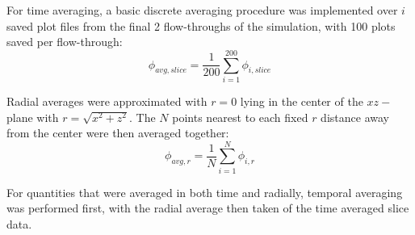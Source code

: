 For time averaging, a basic discrete averaging procedure was implemented over $i$ saved plot files from the final 2 flow-throughs of the simulation, with 100 plots saved per flow-through:
\begin{equation} \label{discrete_time_avg}
\phi_{avg, slice} = \dfrac{1}{200} \sum\limits_{i=1}^{200} \phi_{i, slice}
\end{equation}

Radial averages were approximated with $r = 0$ lying in the center of the $xz-$plane with $r = \sqrt{x^2 + z^2}$. The $N$ points nearest to each fixed $r$ distance away from the center were then averaged together:
\begin{equation} \label{discrete_time_avg}
\phi_{avg, r} = \dfrac{1}{N} \sum\limits_{i=1}^{N} \phi_{i, r}
\end{equation}

For quantities that were averaged in both time and radially, temporal averaging was performed first, with the radial average then taken of the time averaged slice data. 


